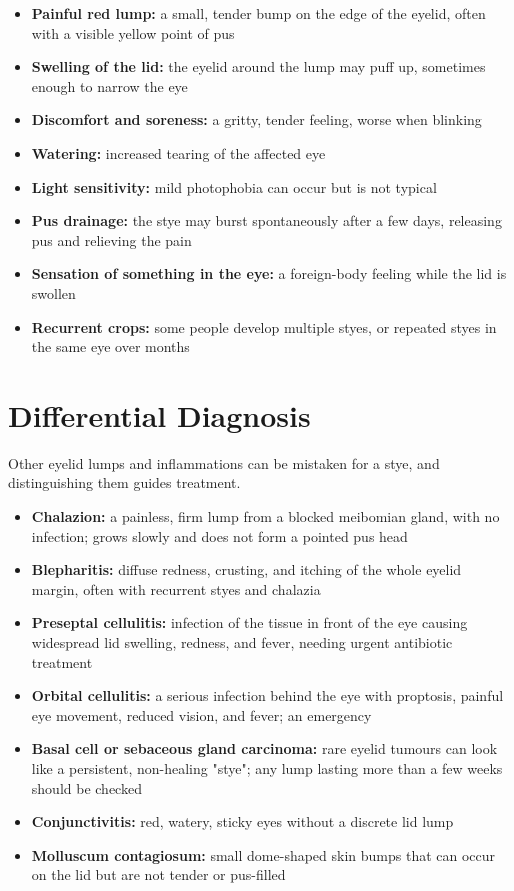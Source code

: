 \begin{itemize}
    \item \textbf{Painful red lump:} a small, tender bump on the edge of the eyelid, often with a visible yellow point of pus
    \item \textbf{Swelling of the lid:} the eyelid around the lump may puff up, sometimes enough to narrow the eye
    \item \textbf{Discomfort and soreness:} a gritty, tender feeling, worse when blinking
    \item \textbf{Watering:} increased tearing of the affected eye
    \item \textbf{Light sensitivity:} mild photophobia can occur but is not typical
    \item \textbf{Pus drainage:} the stye may burst spontaneously after a few days, releasing pus and relieving the pain
    \item \textbf{Sensation of something in the eye:} a foreign-body feeling while the lid is swollen
    \item \textbf{Recurrent crops:} some people develop multiple styes, or repeated styes in the same eye over months
\end{itemize}

\section*{Differential Diagnosis}
Other eyelid lumps and inflammations can be mistaken for a stye, and distinguishing them guides treatment.

\begin{itemize}
    \item \textbf{Chalazion:} a painless, firm lump from a blocked meibomian gland, with no infection; grows slowly and does not form a pointed pus head
    \item \textbf{Blepharitis:} diffuse redness, crusting, and itching of the whole eyelid margin, often with recurrent styes and chalazia
    \item \textbf{Preseptal cellulitis:} infection of the tissue in front of the eye causing widespread lid swelling, redness, and fever, needing urgent antibiotic treatment
    \item \textbf{Orbital cellulitis:} a serious infection behind the eye with proptosis, painful eye movement, reduced vision, and fever; an emergency
    \item \textbf{Basal cell or sebaceous gland carcinoma:} rare eyelid tumours can look like a persistent, non-healing "stye"; any lump lasting more than a few weeks should be checked
    \item \textbf{Conjunctivitis:} red, watery, sticky eyes without a discrete lid lump
    \item \textbf{Molluscum contagiosum:} small dome-shaped skin bumps that can occur on the lid but are not tender or pus-filled
\end{itemize}

